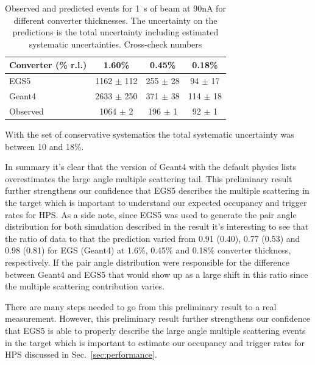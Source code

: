 \begin{table}
\begin{tabular}{|l|c|c|c|}
Converter (\% r.l.) & 1.60\% & 0.45\% &	0.18\% \\
\hline
{\sc EGS5} &	1162 $\pm$ 112 &	255 $\pm$ 28 &	94 $\pm$ 17	\\
\hline
{\sc Geant4} & 2633 $\pm$ 250 & 	371 $\pm$ 38 &	114 $\pm$ 18 \\
\hline
Observed 	& 1064 $\pm$ 2 & 196 $\pm$ 1 &	92 $\pm$ 1 \\						
%						
\hline
\end{tabular}
\caption{ {\small Observed and predicted events for 1~s of beam at 90nA for different converter 
thicknesses. The uncertainty on the predictions is the total uncertainty including estimated 
systematic uncertainties. }{\color{red} Cross-check numbers}}
\end{table}
With the set of conservative systematics the total systematic uncertainty was 
between 10 and 18\%. 

In summary it's clear that the version of  
{\sc Geant4} with the default physics lists overestimates the large angle multiple scattering tail. 
This preliminary result further strengthens our confidence that {\sc EGS5} describes the multiple scattering in the target which is important to understand our expected occupancy and trigger 
rates for HPS. As a side note, since {\sc EGS5} was used to generate the pair 
angle distribution for both simulation described in the result it's interesting to see that the 
ratio of data to that the prediction varied from 0.91 (0.40), 0.77 (0.53) and 0.98 (0.81) for {\sc EGS} ({\sc Geant4}) at 1.6\%, 0.45\% and 0.18\% converter thickness, respectively. If the pair angle distribution were responsible 
for the difference between {\sc Geant4}  and {\sc EGS5} that would show up as a large shift in 
this ratio since the multiple scattering contribution varies. 

There are many steps needed to go from this preliminary result to a real 
measurement. However, this preliminary result further strengthens our confidence that 
{\sc EGS5} is able to properly describe the large angle multiple scattering events in the target 
which is important to estimate our occupancy and trigger rates for HPS discussed in Sec.~\ref{sec:performance}.